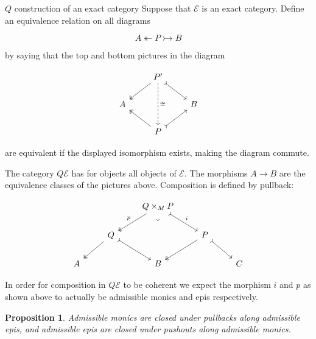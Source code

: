 \documentclass[10pt]{beamer}
\newcounter{dummy} \numberwithin{dummy}{section}
\newtheorem{proposition}[dummy]{Proposition}
\begin{document}
\begin{frame}{\( Q \) construction of an exact category}
	Suppose that \(\mathcal{E}\) is an exact category. Define an equivalence relation on all diagrams
	
	\[
	A \twoheadleftarrow P \rightarrowtail B
	\]
	
	by saying that the top and bottom pictures in the diagram
	
	\[\begin{tikzcd}
		& {P'} \\
		A && B \\
		& P
		\arrow[two heads, from=1-2, to=2-1]
		\arrow[tail, from=1-2, to=2-3]
		\arrow["\cong", dashed, from=1-2, to=3-2]
		\arrow[two heads, from=3-2, to=2-1]
		\arrow[tail, from=3-2, to=2-3]
	\end{tikzcd}\]
	
	are equivalent if the displayed isomorphism exists, making the diagram commute.
	
	The category \( Q\mathcal{E} \) has for objects all objects of \( \mathcal{E} \). The morphisms \( A \to B \) are the equivalence classes of the pictures above. Composition is defined by pullback:
	
	\[\begin{tikzcd}
		&& {Q\times_MP} \\
		& Q && P \\
		A && B && C
		\arrow["p"', two heads, from=1-3, to=2-2]
		\arrow["i", tail, from=1-3, to=2-4]
		\arrow["\lrcorner"{anchor=center, pos=0.125, rotate=-45}, draw=none, from=1-3, to=3-3]
		\arrow[two heads, from=2-2, to=3-1]
		\arrow[tail, from=2-2, to=3-3]
		\arrow[two heads, from=2-4, to=3-3]
		\arrow[tail, from=2-4, to=3-5]
	\end{tikzcd}\]
	
	
	In order for composition in \( Q\mathcal{E}\) to be coherent we expect the morphism \( i \) and \( p \) as shown above to actually be admissible monics and epis respectively.
	\begin{proposition}Admissible monics are closed under pullbacks along admissible epis, and admissible epis are closed under pushouts along admissible monics.
	\end{proposition}
\end{frame}
\end{document}
